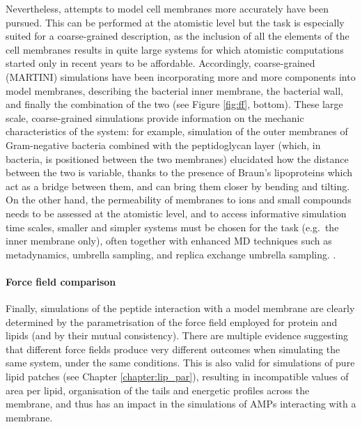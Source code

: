 Nevertheless, attempts to model cell membranes more accurately have been pursued. This can be performed at the atomistic level \citep{Piggot2011}
but the task is especially suited for a coarse-grained description, as the inclusion of all the elements of the cell membranes results in quite large systems for which atomistic computations started only in recent years to be affordable.
%
Accordingly, coarse-grained (MARTINI) simulations have been incorporating more and more components into model membranes, describing the bacterial inner membrane, the bacterial wall, and finally the combination of the two \citep{Khalid2019} (see Figure \ref{fig:ff}, bottom).
%
These large scale, coarse-grained simulations provide information on the mechanic characteristics of the system: for example, simulation of the outer membranes of Gram-negative bacteria combined with the peptidoglycan layer (which, in bacteria, is positioned between the two membranes) elucidated how the distance between the two is variable, thanks to the presence of Braun's lipoproteins \citep{Asmar2018} which act as a bridge between them, and can bring them closer by bending and tilting.
%
On the other hand, the permeability of membranes to ions and small compounds needs to be assessed at the atomistic level, and to access informative simulation time scales, smaller and simpler systems must be chosen for the task (e.g.\ the inner membrane only), often together with enhanced MD techniques such as metadynamics, umbrella sampling, and replica exchange umbrella sampling. \citep{Sun2016,Piggot2011,Carpenter2016,Pokhrel2018}.

\paragraph{Force field comparison} Finally, simulations of the peptide interaction with a model membrane are clearly determined by the parametrisation of the force field employed for protein and lipids (and by their mutual consistency).
%
There are multiple evidence suggesting that different force fields produce very different outcomes when simulating the same system, under the same conditions. This is also valid for simulations of pure lipid patches (see Chapter \ref{chapter:lip_par}), resulting in incompatible values of area per lipid, organisation of the tails and energetic profiles across the membrane, and thus has an impact in the simulations of AMPs interacting with a membrane.

